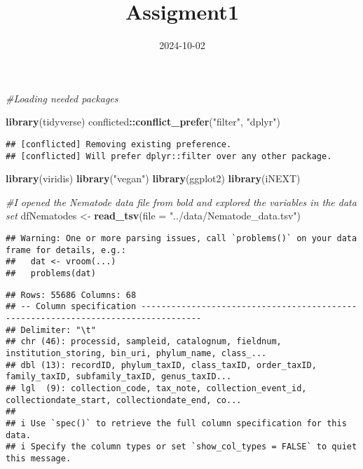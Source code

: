 \documentclass[
]{article}
\title{Assigment1}
\author{}
\date{\vspace{-2.5em}2024-10-02}
\newenvironment{Shaded}{\begin{snugshade}}{\end{snugshade}}
\newcommand{\AttributeTok}[1]{\textcolor[rgb]{0.13,0.29,0.53}{#1}}
\newcommand{\CommentTok}[1]{\textcolor[rgb]{0.56,0.35,0.01}{\textit{#1}}}
\newcommand{\FunctionTok}[1]{\textcolor[rgb]{0.13,0.29,0.53}{\textbf{#1}}}
\newcommand{\NormalTok}[1]{#1}
\newcommand{\OtherTok}[1]{\textcolor[rgb]{0.56,0.35,0.01}{#1}}
\newcommand{\SpecialCharTok}[1]{\textcolor[rgb]{0.81,0.36,0.00}{\textbf{#1}}}
\newcommand{\StringTok}[1]{\textcolor[rgb]{0.31,0.60,0.02}{#1}}
\begin{document}
\maketitle

\begin{Shaded}
\begin{Highlighting}[]
\CommentTok{\#Loading needed packages}

\FunctionTok{library}\NormalTok{(tidyverse)}
\NormalTok{conflicted}\SpecialCharTok{::}\FunctionTok{conflict\_prefer}\NormalTok{(}\StringTok{"filter"}\NormalTok{, }\StringTok{"dplyr"}\NormalTok{)}
\end{Highlighting}
\end{Shaded}

\begin{verbatim}
## [conflicted] Removing existing preference.
## [conflicted] Will prefer dplyr::filter over any other package.
\end{verbatim}

\begin{Shaded}
\begin{Highlighting}[]
\FunctionTok{library}\NormalTok{(viridis)}
\FunctionTok{library}\NormalTok{(}\StringTok{"vegan"}\NormalTok{)}
\FunctionTok{library}\NormalTok{(ggplot2)}
\FunctionTok{library}\NormalTok{(iNEXT)}

\CommentTok{\#I opened the Nematode data file from bold and explored the variables in the data set }
\NormalTok{dfNematodes }\OtherTok{\textless{}{-}} \FunctionTok{read\_tsv}\NormalTok{(}\AttributeTok{file =} \StringTok{"../data/Nematode\_data.tsv"}\NormalTok{)}
\end{Highlighting}
\end{Shaded}

\begin{verbatim}
## Warning: One or more parsing issues, call `problems()` on your data frame for details, e.g.:
##   dat <- vroom(...)
##   problems(dat)
\end{verbatim}

\begin{verbatim}
## Rows: 55686 Columns: 68
## -- Column specification ----------------------------------------------------------------------------------
## Delimiter: "\t"
## chr (46): processid, sampleid, catalognum, fieldnum, institution_storing, bin_uri, phylum_name, class_...
## dbl (13): recordID, phylum_taxID, class_taxID, order_taxID, family_taxID, subfamily_taxID, genus_taxID...
## lgl  (9): collection_code, tax_note, collection_event_id, collectiondate_start, collectiondate_end, co...
## 
## i Use `spec()` to retrieve the full column specification for this data.
## i Specify the column types or set `show_col_types = FALSE` to quiet this message.
\end{verbatim}
\end{document}
